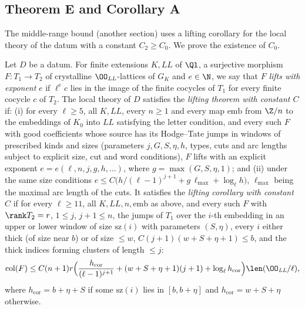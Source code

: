 \subsection{Theorem E and Corollary A}\label{sec:pf:linkN-sel:thmE}

The middle-range bound  (another section) uses a lifting corollary for the local theory
of the datum with a constant $C_2\ge C_0$. We prove the existence of $C_0$.

\begin{definition}\label{pf:linkN-sel:liftdef}
Let $D$ be a datum. For finite extensions $K,\mathit{LL}$ of $\Ql$, a surjective morphism $F\colon T_1\to T_2$ of crystalline
$\OO_{\mathit{LL}}$-lattices of $G_K$ and $e\in\N$, we say that $F$ \emph{lifts with exponent} $e$ if $\ell^e c$ lies in the image of the finite
cocycles of $T_1$ for every finite cocycle $c$ of $T_2$. The local theory of $D$ satisfies the \emph{lifting theorem with constant $C$} if:
(i) for every $\ell\ge5$, all $K,\mathit{LL}$, every $n\ge1$ and every map $\mathrm{emb}$ from $\Z/n$ to the embeddings of $K_0$ into
$\mathit{LL}$ satisfying the letter condition, and every such $F$ with good coefficients whose source has its Hodge--Tate jumps in windows of
prescribed kinds and sizes (parameters $j,G,S,\eta,h$, types, cuts and arc lengths subject to explicit size, cut and word conditions), $F$ lifts with
an explicit exponent $e=e(\ell,n,j,g,h,\dots)$, where $g=\max(G,S,\eta,1)$; and (ii) under the same size conditions
$e\le C\bigl(h/(\ell-1)^{j+1}+g\,\ell_{\max}+\log_\ell h\bigr)$, $\ell_{\max}$ being the maximal arc length of the cuts. It satisfies the
\emph{lifting corollary with constant $C$} if for every $\ell\ge11$, all $K,\mathit{LL},n,\mathrm{emb}$ as above, and every such $F$ with
$\rank T_2=r$, $1\le j$, $j+1\le n$, the jumps of $T_1$ over the $i$-th embedding in an upper or lower window of size $\mathrm{sz}(i)$ with
parameters $(S,\eta)$, every $i$ either thick (of size near $b$) or of size $\le w$, $C(j+1)(w+S+\eta+1)\le b$, and the thick indices forming
clusters of length $\le j$:
\[
\mathrm{col}(F)\le C(n+1)r\Bigl(\frac{h_{\mathrm{cor}}}{(\ell-1)^{j+1}}+(w+S+\eta+1)(j+1)+\log_\ell h_{\mathrm{cor}}\Bigr)\len(\OO_{\mathit{LL}}/\ell),
\]
where $h_{\mathrm{cor}}=b+\eta+S$ if some $\mathrm{sz}(i)$ lies in $[b,b+\eta]$ and $h_{\mathrm{cor}}=w+S+\eta$ otherwise.
\end{definition}

